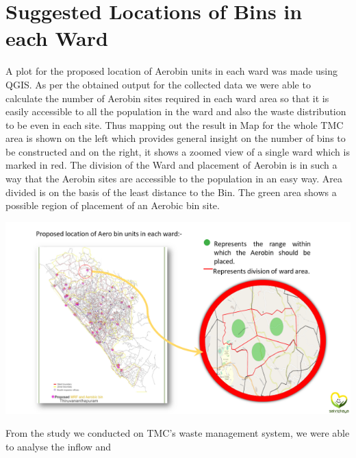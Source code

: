 \documentclass[12pt,a4paper]{  report}
\begin{document}
\section{Suggested Locations of Bins in each Ward}
\begin{justify}
	 A plot for the proposed location of Aerobin units in each ward was made using QGIS. As per the obtained output for the collected data we were able to calculate the number of Aerobin sites required in each ward area so that it is easily accessible to all the population in the ward and also the waste distribution to be even in each site. Thus mapping out the result in Map for the whole TMC area is shown on the left which provides general insight on the number of bins to be constructed and on the right, it shows a zoomed view of a single ward which is marked in red. The division of the Ward and placement of Aerobin is in such a way that the Aerobin sites are accessible to the population in an easy way. Area divided is on the basis of the least distance to the Bin. The green area shows a possible region of placement of an Aerobic bin site.
	 
	 \centering
	 \includegraphics[width=1\textwidth]{bin_loc}
\end{justify}

From the study we conducted on TMC’s waste management system, we were able to analyse the inflow and %
%
\end{document}
